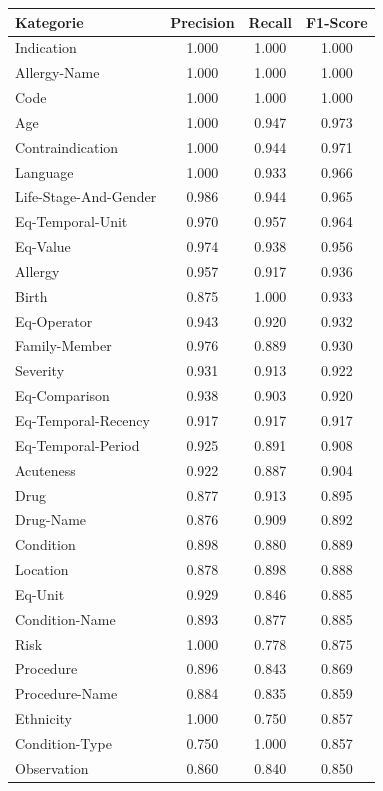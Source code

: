 \begin{table}[htbp]
\centering
\begin{tabular}{p{5cm}ccc}
\toprule
\textbf{Kategorie} & \textbf{Precision} & \textbf{Recall} & \textbf{F1-Score} \\
\midrule
Indication & 1.000 & 1.000 & 1.000 \\
Allergy-Name & 1.000 & 1.000 & 1.000 \\
Code & 1.000 & 1.000 & 1.000 \\
Age & 1.000 & 0.947 & 0.973 \\
Contraindication & 1.000 & 0.944 & 0.971 \\
Language & 1.000 & 0.933 & 0.966 \\
Life-Stage-And-Gender & 0.986 & 0.944 & 0.965 \\
Eq-Temporal-Unit & 0.970 & 0.957 & 0.964 \\
Eq-Value & 0.974 & 0.938 & 0.956 \\
Allergy & 0.957 & 0.917 & 0.936 \\
Birth & 0.875 & 1.000 & 0.933 \\
Eq-Operator & 0.943 & 0.920 & 0.932 \\
Family-Member & 0.976 & 0.889 & 0.930 \\
Severity & 0.931 & 0.913 & 0.922 \\
Eq-Comparison & 0.938 & 0.903 & 0.920 \\
Eq-Temporal-Recency & 0.917 & 0.917 & 0.917 \\
Eq-Temporal-Period & 0.925 & 0.891 & 0.908 \\
Acuteness & 0.922 & 0.887 & 0.904 \\
Drug & 0.877 & 0.913 & 0.895 \\
Drug-Name & 0.876 & 0.909 & 0.892 \\
Condition & 0.898 & 0.880 & 0.889 \\
Location & 0.878 & 0.898 & 0.888 \\
Eq-Unit & 0.929 & 0.846 & 0.885 \\
Condition-Name & 0.893 & 0.877 & 0.885 \\
Risk & 1.000 & 0.778 & 0.875 \\
Procedure & 0.896 & 0.843 & 0.869 \\
Procedure-Name & 0.884 & 0.835 & 0.859 \\
Ethnicity & 1.000 & 0.750 & 0.857 \\
Condition-Type & 0.750 & 1.000 & 0.857 \\
Observation & 0.860 & 0.840 & 0.850 \\

\end{tabular}
\end{table}
